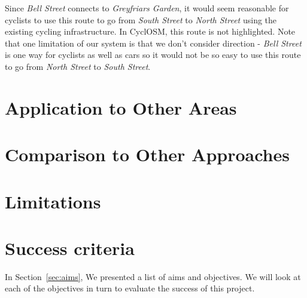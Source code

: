 \documentclass[12pt,a4paper]{report}
\begin{document}
Since \textit{Bell Street} connects to \textit{Greyfriars Garden}, it would seem reasonable for cyclists to use this route to go from \textit{South Street} to \textit{North Street} using the existing cycling infrastructure. In CyclOSM, this route is not highlighted. Note that one limitation of our system is that we don't consider direction - \textit{Bell Street} is one way for cyclists as well as cars so it would not be so easy to use this route to go from \textit{North Street} to \textit{South Street}.

\section{Application to Other Areas}

\section{Comparison to Other Approaches}

\section{Limitations}


\section{Success criteria}
In Section~\ref{sec:aims}, We presented a list of aims and objectives. We will look at each of the objectives in turn to evaluate the success of this project.
\end{document}
